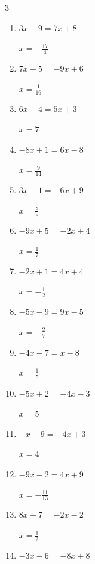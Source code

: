 \begin{multicols}{3}
\begin{enumerate}
        $\displaystyle x=-\frac{4}{13}$

  \item $3x-9=7x+8$

        $\displaystyle x=-\frac{17}{4}$

  \item $7x+5=-9x+6$

        $\displaystyle x=\frac{1}{16}$

  \item $6x-4=5x+3$

        $\displaystyle x=7$

  \item $-8x+1=6x-8$

        $\displaystyle x=\frac{9}{14}$

  \item $3x+1=-6x+9$

        $\displaystyle x=\frac{8}{9}$

  \item $-9x+5=-2x+4$

        $\displaystyle x=\frac{1}{7}$

  \item $-2x+1=4x+4$

        $\displaystyle x=-\frac{1}{2}$

  \item $-5x-9=9x-5$

        $\displaystyle x=-\frac{2}{7}$

  \item $-4x-7=x-8$

        $\displaystyle x=\frac{1}{5}$

  \item $-5x+2=-4x-3$

        $\displaystyle x=5$

  \item $-x-9=-4x+3$

        $\displaystyle x=4$

  \item $-9x-2=4x+9$

        $\displaystyle x=-\frac{11}{13}$

  \item $8x-7=-2x-2$

        $\displaystyle x=\frac{1}{2}$

\columnbreak %

\resetques

  \item $-3x-6=-8x+8$


\end{enumerate}
\end{multicols}
